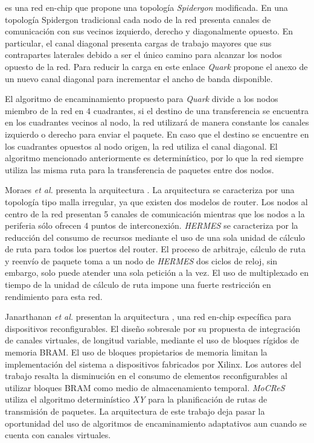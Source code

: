 \cite{chapter3:5076186, chapter3:4724383, chapter3:5161210, chapter3:4724416} es una red en-chip que propone una topología \textit{Spidergon}\cite{chapter3:1411133, chapter3:4221002} modificada. En una topología Spidergon tradicional cada nodo de la red presenta canales de comunicación con sus vecinos izquierdo, derecho y diagonalmente opuesto. En particular, el canal diagonal presenta cargas de trabajo mayores que sus contrapartes laterales debido a ser el único camino para alcanzar los nodos opuesto de la red. Para reducir la carga en este enlace \textit{Quark} propone el anexo de un nuevo canal diagonal para incrementar el ancho de banda disponible.

El algoritmo de encaminamiento propuesto para \textit{Quark} divide a los nodos miembro de la red en 4 cuadrantes, si el destino de una transferencia se encuentra en los cuadrantes vecinos al nodo, la red utilizará de manera constante los canales izquierdo o derecho para enviar el paquete. En caso que el destino se encuentre en los cuadrantes opuestos al nodo origen, la red utiliza el canal diagonal. El algoritmo mencionado anteriormente es determinístico, por lo que la red siempre utiliza las misma ruta para la transferencia de paquetes entre dos nodos.

Moraes \textit{et al.}\cite{chapter3:Moraes200469} presenta la arquitectura . La arquitectura se caracteriza por una topología tipo malla irregular, ya que existen dos modelos de router. Los nodos al centro de la red presentan 5 canales de comunicación mientras que los nodos a la periferia sólo ofrecen 4 puntos de interconexión. \textit{HERMES} se caracteriza por la reducción del consumo de recursos mediante el uso de una sola unidad de cálculo de ruta para todos los puertos del router. El proceso de arbitraje, cálculo de ruta y reenvío de paquete toma a un nodo de \textit{HERMES} dos ciclos de reloj, sin embargo, solo puede atender una sola petición a la vez. El uso de multiplexado en tiempo de la unidad de cálculo de ruta impone una fuerte restricción en rendimiento para esta red.

Janarthanan \textit{et al.} presentan la arquitectura \cite{chapter3:4208959}, una red en-chip específica para dispositivos reconfigurables. El diseño sobresale por su propuesta de integración de canales virtuales, de longitud variable,  mediante el uso de bloques rígidos de memoria BRAM. El uso de bloques propietarios de memoria limitan la implementación del sistema a dispositivos fabricados por Xilinx. Los autores del trabajo resalta la disminución en el consumo de elementos reconfigurables al utilizar bloques BRAM como medio de almacenamiento temporal. \textit{MoCReS} utiliza el algoritmo determinístico \textit{XY} para la planificación de rutas de transmisión de paquetes. La arquitectura de este trabajo deja pasar la oportunidad del uso de algoritmos de encaminamiento adaptativos aun cuando se cuenta con canales virtuales.

